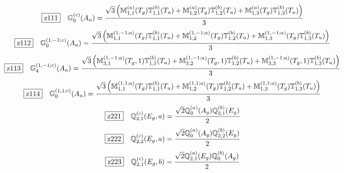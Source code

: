 \documentclass[fleqn,10pt,landscape]{jsarticle}
\begin{document}
\begin{dmath*}
\hspace*{3mm}\fbox{z111}\quad \mathbb{G}_{0}^{(c)}(A_{u})=\frac{\sqrt{3} \left(\mathbb{M}_{1,1}^{(a)}(T_{g}) \mathbb{T}_{1,1}^{(b)}(T_{u}) + \mathbb{M}_{1,2}^{(a)}(T_{g}) \mathbb{T}_{1,2}^{(b)}(T_{u}) + \mathbb{M}_{1,3}^{(a)}(T_{g}) \mathbb{T}_{1,3}^{(b)}(T_{u})\right)}{3}
\end{dmath*}
\begin{dmath*}
\hspace*{3mm}\fbox{z112}\quad \mathbb{G}_{0}^{(1,-1;c)}(A_{u})=\frac{\sqrt{3} \left(\mathbb{M}_{1,1}^{(1,-1;a)}(T_{g}) \mathbb{T}_{1,1}^{(b)}(T_{u}) + \mathbb{M}_{1,2}^{(1,-1;a)}(T_{g}) \mathbb{T}_{1,2}^{(b)}(T_{u}) + \mathbb{M}_{1,3}^{(1,-1;a)}(T_{g}) \mathbb{T}_{1,3}^{(b)}(T_{u})\right)}{3}
\end{dmath*}
\begin{dmath*}
\hspace*{3mm}\fbox{z113}\quad \mathbb{G}_{4}^{(1,-1;c)}(A_{u})=\frac{\sqrt{3} \left(\mathbb{M}_{3,1}^{(1,-1;a)}(T_{g},1) \mathbb{T}_{1,1}^{(b)}(T_{u}) + \mathbb{M}_{3,2}^{(1,-1;a)}(T_{g},1) \mathbb{T}_{1,2}^{(b)}(T_{u}) + \mathbb{M}_{3,3}^{(1,-1;a)}(T_{g},1) \mathbb{T}_{1,3}^{(b)}(T_{u})\right)}{3}
\end{dmath*}
\begin{dmath*}
\hspace*{3mm}\fbox{z114}\quad \mathbb{G}_{0}^{(1,1;c)}(A_{u})=\frac{\sqrt{3} \left(\mathbb{M}_{1,1}^{(1,1;a)}(T_{g}) \mathbb{T}_{1,1}^{(b)}(T_{u}) + \mathbb{M}_{1,2}^{(1,1;a)}(T_{g}) \mathbb{T}_{1,2}^{(b)}(T_{u}) + \mathbb{M}_{1,3}^{(1,1;a)}(T_{g}) \mathbb{T}_{1,3}^{(b)}(T_{u})\right)}{3}
\end{dmath*}
\begin{dmath*}
\hspace*{3mm}\fbox{z221}\quad \mathbb{Q}_{2,1}^{(c)}(E_{g},a)=\frac{\sqrt{2} \mathbb{Q}_{0}^{(a)}(A_{g}) \mathbb{Q}_{2,1}^{(b)}(E_{g})}{2}
\end{dmath*}
\begin{dmath*}
\hspace*{3mm}\fbox{z222}\quad \mathbb{Q}_{2,2}^{(c)}(E_{g},a)=\frac{\sqrt{2} \mathbb{Q}_{0}^{(a)}(A_{g}) \mathbb{Q}_{2,2}^{(b)}(E_{g})}{2}
\end{dmath*}
\begin{dmath*}
\hspace*{3mm}\fbox{z223}\quad \mathbb{Q}_{2,1}^{(c)}(E_{g},b)=\frac{\sqrt{2} \mathbb{Q}_{2,1}^{(a)}(E_{g}) \mathbb{Q}_{0}^{(b)}(A_{g})}{2}
\end{dmath*}
\end{document}
